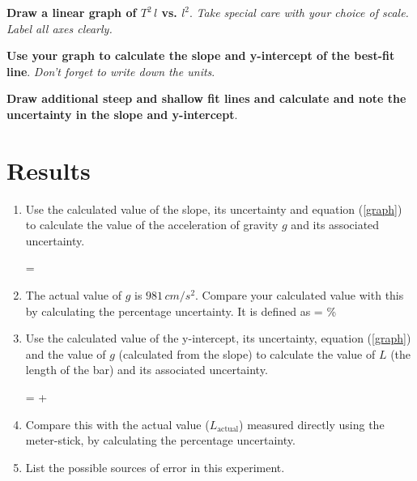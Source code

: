 \documentclass{article}
\begin{document}
      \textbf{Draw a linear graph of $T^2 \, l$ vs. $l^2$}. \textit{Take special care with your choice of scale. Label all axes clearly.}

      \textbf{Use your graph to calculate the slope and y-intercept of the best-fit line}. \textit{Don't forget to write down the units}.

      \textbf{Draw additional steep and shallow fit lines and calculate and note the uncertainty in the slope and y-intercept}.


   \section*{Results}

      \begin{enumerate}

         \item Use the calculated value of the slope, its uncertainty and equation (\ref{graph}) to calculate the value of the acceleration of gravity $g$ and its associated uncertainty.

            \beqn
                = 
            \eeqn
         
         \item The actual value of $g$ is $981 \, cm/s^2$. Compare your calculated value with this by calculating the percentage uncertainty. It is defined as
         \beq
          =   \%
         \eeq

      \item Use the calculated value of the y-intercept, its uncertainty, equation (\ref{graph}) and the value of $g$ (calculated from the slope) to calculate the value of $L$ (the length of the bar) and its associated uncertainty.

            \beqn
                =   +  
            \eeqn

         \item Compare this with the actual value ($L_\text{actual}$) measured directly using the meter-stick, by calculating the percentage uncertainty.

         \item List the possible sources of error in this experiment.

   \end{enumerate}
\end{document}
